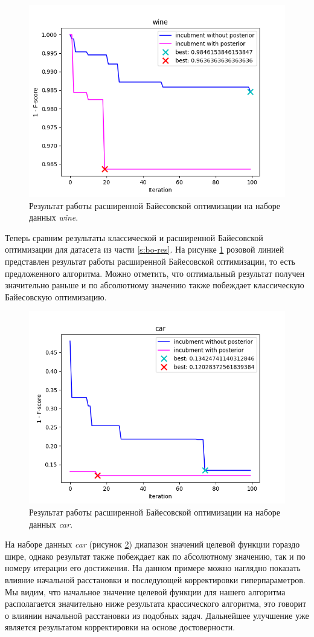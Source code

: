 \documentclass[times,specification,annotation]{itmo-student-thesis}
\begin{document}
	\begin{figure}[!ht]
		\caption{Результат работы расширенной Байесовской оптимизации на наборе данных \textit{wine}.}\label{img:pbo-wine}
		\includegraphics[width=0.85\linewidth]{../png/incubment-iteration-posterior/wine}
		\centering
	\end{figure}
	Теперь сравним результаты классической и расширенной Байесовской оптимизации для датасета из части \ref{s:bo-res}. 
	На рисунке \ref{img:pbo-wine} розовой линией представлен результат работы расширенной Байесовской оптимизации, то есть предложенного алгоритма. Можно отметить, что оптимальный результат получен значительно раньше и по абсолютному значению также побеждает классическую Байесовскую оптимизацию. 
	\begin{figure}[!ht]
		\caption{Результат работы расширенной Байесовской оптимизации на наборе данных \textit{car}.}\label{img:pbo-car}
		\includegraphics[width=0.85\linewidth]{../png/incubment-iteration-posterior/car}
		\centering
	\end{figure}
	На наборе данных \textit{car} (рисунок \ref{img:pbo-car}) диапазон значений целевой функции гораздо шире, однако результат также побеждает как по абсолютному значению, так и по номеру итерации его достижения. На данном примере можно наглядно показать влияние начальной расстановки и последующей корректировки гиперпараметров. Мы видим, что начальное значение целевой функции для нашего алгоритма располагается значительно ниже результата крассического алгоритма, это говорит о влиянии начальной расстановки из подобных задач. Дальнейшее улучшение уже является результатом корректировки на основе достоверности. \par 
	
\end{document}
